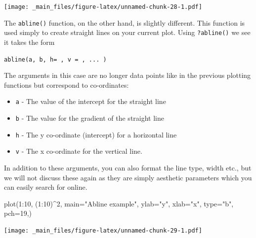 \documentclass[
]{book}
\newenvironment{Shaded}{\begin{snugshade}}{\end{snugshade}}
\newcommand{\AttributeTok}[1]{\textcolor[rgb]{0.77,0.63,0.00}{#1}}
\newcommand{\DecValTok}[1]{\textcolor[rgb]{0.00,0.00,0.81}{#1}}
\newcommand{\FunctionTok}[1]{\textcolor[rgb]{0.00,0.00,0.00}{#1}}
\newcommand{\NormalTok}[1]{#1}
\newcommand{\SpecialCharTok}[1]{\textcolor[rgb]{0.00,0.00,0.00}{#1}}
\newcommand{\StringTok}[1]{\textcolor[rgb]{0.31,0.60,0.02}{#1}}
\providecommand{\tightlist}{%
  \setlength{\itemsep}{0pt}\setlength{\parskip}{0pt}}
\theoremstyle{definition}
\theoremstyle{definition}
\theoremstyle{definition}
\theoremstyle{definition}
\theoremstyle{remark}
\begin{document}
\texttt{[image: \_main\_files/figure-latex/unnamed-chunk-28-1.pdf]}

The \texttt{abline()} function, on the other hand, is slightly different. This function is used simply to create straight lines on your current plot. Using \texttt{?abline()} we see it takes the form

\texttt{abline(a,\ b,\ h=\ ,\ v\ =\ ,\ ...\ )}

The arguments in this case are no longer data points like in the previous plotting functions but correspond to co-ordinates:

\begin{itemize}
\tightlist
\item
  \texttt{a} - The value of the intercept for the straight line
\item
  \texttt{b} - The value for the gradient of the straight line
\item
  \texttt{h} - The y co-ordinate (intercept) for a horizontal line
\item
  \texttt{v} - The x co-ordinate for the vertical line.
\end{itemize}

In addition to these arguments, you can also format the line type, width etc., but we will not discuss these again as they are simply aesthetic parameters which you can easily search for online.

\begin{Shaded}
\begin{Highlighting}[]
\FunctionTok{plot}\NormalTok{(}\DecValTok{1}\SpecialCharTok{:}\DecValTok{10}\NormalTok{, (}\DecValTok{1}\SpecialCharTok{:}\DecValTok{10}\NormalTok{)}\SpecialCharTok{\^{}}\DecValTok{2}\NormalTok{,}
     \AttributeTok{main=}\StringTok{"Abline example"}\NormalTok{,}
     \AttributeTok{ylab=}\StringTok{"y"}\NormalTok{,}
     \AttributeTok{xlab=}\StringTok{"x"}\NormalTok{,}
     \AttributeTok{type=}\StringTok{"b"}\NormalTok{,}
     \AttributeTok{pch=}\DecValTok{19}\NormalTok{,)}
\end{Highlighting}
\end{Shaded}

\texttt{[image: \_main\_files/figure-latex/unnamed-chunk-29-1.pdf]}
\end{document}
